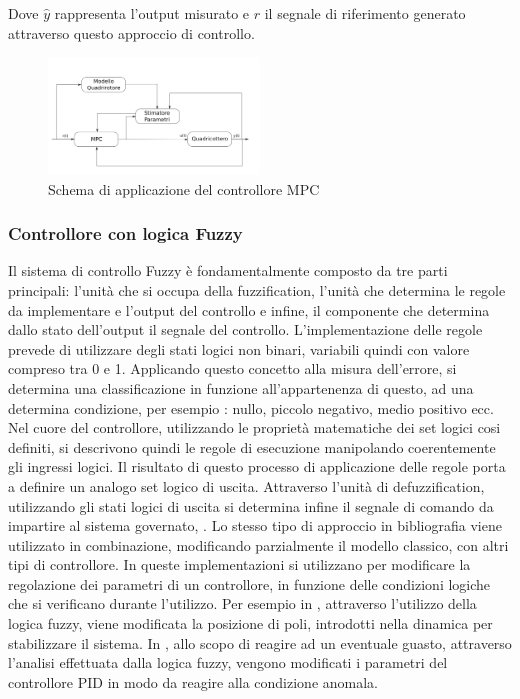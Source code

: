 Dove $\hat{y}$ rappresenta l'output misurato e $r$ il segnale di riferimento generato attraverso questo approccio di controllo.

\begin{figure}
	\centering
	\includegraphics[width=0.5\textwidth]{SistemaQuadrirotore/Figure/MPC}
	\caption{Schema di applicazione del controllore MPC}
\end{figure}

\subsubsection{Controllore con logica Fuzzy}

Il sistema di controllo Fuzzy è fondamentalmente composto da tre parti principali: l'unità che si occupa della fuzzification, l'unità che determina le regole da implementare e l'output del controllo e infine, il componente che determina dallo stato dell'output il segnale del controllo. 
L'implementazione delle regole prevede di utilizzare degli stati logici non binari, variabili quindi con valore compreso tra 0 e 1. Applicando questo concetto alla misura dell'errore, si determina una classificazione in funzione all'appartenenza di questo, ad una determina condizione, per esempio : nullo, piccolo negativo, medio positivo  ecc.
Nel cuore del controllore, utilizzando le proprietà matematiche dei set logici cosi definiti, si descrivono quindi le regole di esecuzione manipolando coerentemente gli ingressi logici. Il risultato di questo processo di applicazione delle regole porta a definire un analogo set logico di uscita. Attraverso l'unità di defuzzification, utilizzando gli stati logici di uscita si determina infine il segnale di comando da impartire al sistema governato, \cite{ChenGuanrong2001ItFS}.
Lo stesso tipo di approccio in bibliografia viene utilizzato in combinazione, modificando parzialmente il modello classico, con altri tipi di controllore. In queste implementazioni si utilizzano per modificare la regolazione dei parametri di un controllore, in funzione delle condizioni logiche che si verificano durante l'utilizzo.
Per esempio in \cite{6988024}, attraverso l'utilizzo della logica fuzzy, viene modificata la posizione di poli, introdotti nella dinamica per stabilizzare il sistema. In \cite{AmoozgarMohammadHadi2012FFGP}, allo scopo di reagire ad un eventuale guasto, attraverso l'analisi effettuata dalla logica fuzzy, vengono modificati i parametri del controllore PID in modo da reagire alla condizione anomala.


